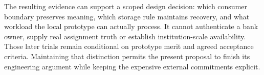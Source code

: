 The resulting evidence can support a scoped design decision: which consumer
boundary preserves meaning, which storage rule maintains recovery, and what
workload the local prototype can actually process. It cannot authenticate a
bank owner, supply real assignment truth or establish institution-scale
availability. Those later trials remain conditional on prototype merit and
agreed acceptance criteria. Maintaining that distinction permits the present
proposal to finish its engineering argument while keeping the expensive
external commitments explicit.
\label{exec17:i4-capacity-end}
